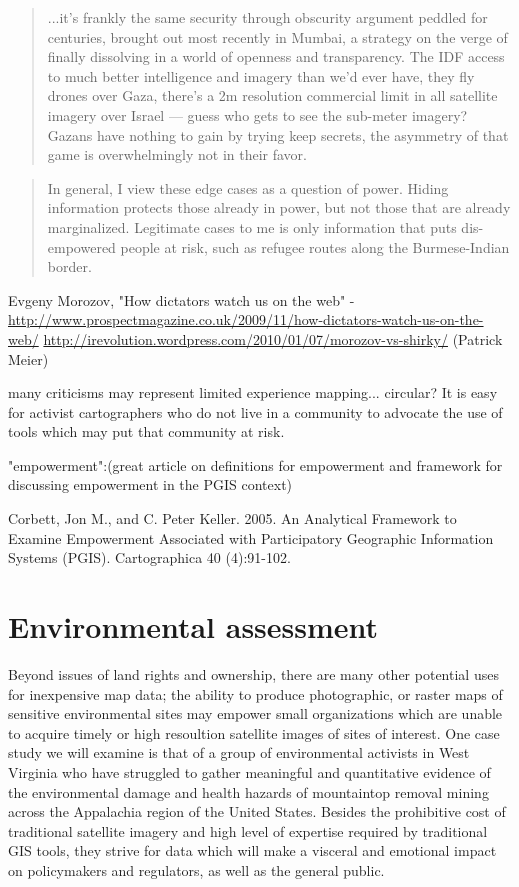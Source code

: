\documentclass[11pt]{report}
\begin{document}
\begin{quote}
...it's frankly the same security through obscurity argument peddled for centuries, brought out most recently in Mumbai, a strategy on the verge of finally dissolving in a world of openness and transparency. The IDF access to much better intelligence and imagery than we'd ever have, they fly drones over Gaza, there's a 2m resolution commercial limit in all satellite imagery over Israel — guess who gets to see the sub-meter imagery? Gazans have nothing to gain by trying keep secrets, the asymmetry of that game is overwhelmingly not in their favor.\cite{maron2009misconceptions}
\end{quote}

\begin{quote}
In general, I view these edge cases as a question of power. Hiding information protects those already in power, but not those that are already marginalized. Legitimate cases to me is only information that puts dis-empowered people at risk, such as refugee routes along the Burmese-Indian border.\cite{maron2010freedom}
\end{quote}

Evgeny Morozov, "How dictators watch us on the web" - \url{http://www.prospectmagazine.co.uk/2009/11/how-dictators-watch-us-on-the-web/}
\url{http://irevolution.wordpress.com/2010/01/07/morozov-vs-shirky/} (Patrick Meier)

many criticisms may represent limited experience mapping... circular?
It is easy for activist cartographers who do not live in a community to advocate the use of tools which may put that community at risk.

"empowerment":(great article on definitions for empowerment and framework for discussing empowerment in the PGIS context)

Corbett, Jon M., and C. Peter Keller. 2005. An Analytical Framework to Examine Empowerment Associated with Participatory Geographic Information Systems (PGIS). Cartographica 40 (4):91-102.

\section{Environmental assessment}

Beyond issues of land rights and ownership, there are many other potential uses for inexpensive map data; the ability to produce photographic, or raster maps of sensitive environmental sites may empower small organizations which are unable to acquire timely or high resoultion satellite images of sites of interest. One case study we will examine is that of a group of environmental activists in West Virginia who have struggled to gather meaningful and quantitative evidence of the environmental damage and health hazards of mountaintop removal mining across the Appalachia region of the United States. Besides the prohibitive cost of traditional satellite imagery and high level of expertise required by traditional GIS tools, they strive for data which will make a visceral and emotional impact on policymakers and regulators, as well as the general public. 
\end{document}
